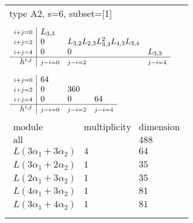 \documentclass[crop,border=2mm]{standalone}
\begin{document}
\begin{tabular}{l}
{\huge type A2, s=6, subset=[1]}\\ \\


$\displaystyle
\begin{array}{r|l l l}
	{\scriptstyle i+j=0}&L_{3,3}&&\\
	{\scriptstyle i+j=2}&0&L_{3,2}L_{2,3}L_{3,3}^{2}L_{4,3}L_{3,4}&\\
	{\scriptstyle i+j=4}&0&0&L_{3,3}\\
	\hline h^{i,j}&{\scriptstyle j-i=0}&{\scriptstyle j-i=2}&{\scriptstyle j-i=4}
\end{array}
$ \\ \\


$\displaystyle
\begin{array}{r|l l l}
	{\scriptstyle i+j=0}&64&&\\
	{\scriptstyle i+j=2}&0&360&\\
	{\scriptstyle i+j=4}&0&0&64\\
	\hline h^{i,j}&{\scriptstyle j-i=0}&{\scriptstyle j-i=2}&{\scriptstyle j-i=4}
\end{array}
$ \\ \\


$\displaystyle
\begin{array}{rll}
	\text{module}&\text{multiplicity}&\text{dimension} \\ \hline \text{all}&&488 \\
	L\left( 3\alpha_{1}+ 3\alpha_{2}\right)&4&64\\
	L\left( 3\alpha_{1}+ 2\alpha_{2}\right)&1&35\\
	L\left( 2\alpha_{1}+ 3\alpha_{2}\right)&1&35\\
	L\left( 4\alpha_{1}+ 3\alpha_{2}\right)&1&81\\
	L\left( 3\alpha_{1}+ 4\alpha_{2}\right)&1&81
\end{array}
$ \\ \\

\end{tabular}
\end{document}
